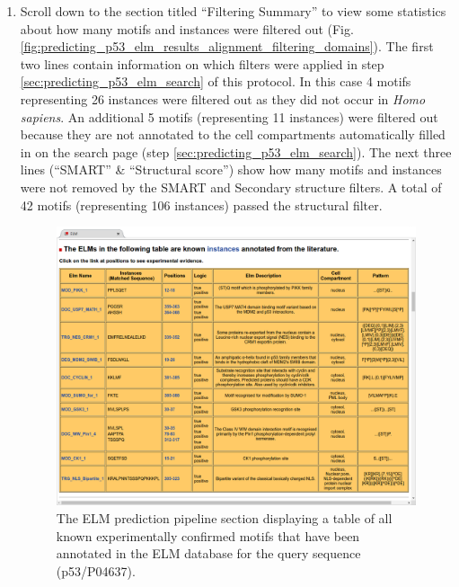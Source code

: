 \documentclass[12pt]{article}
\newcounter{proto}
\begin{document}
\begin{enumerate}
\item Scroll down to the section titled ``Filtering Summary'' to view some
	statistics about how many motifs and instances were filtered out
	(Fig.
	\ref{fig:predicting_p53_elm_results_alignment_filtering_domains}).
	The first two lines contain information on
	which filters were applied in step \ref{sec:predicting_p53_elm_search} of this protocol.
	In this case 4 motifs representing 26 instances were filtered
	out as they did not occur in \textit{Homo sapiens}. An additional 5
	motifs (representing 11 instances) were filtered out because they are
	not annotated to the cell compartments automatically filled in on the
	search page (step \ref{sec:predicting_p53_elm_search}).
	The next three lines (``SMART'' \& ``Structural score'') show how many
	motifs and instances were not removed by the SMART and Secondary
	structure filters. A total of 42 motifs (representing 106 instances)
	passed the structural filter.


\begin{figure}[h!]
	\centering
	\includegraphics[width=\textwidth]{Figures/predicting_p53/elm_results_known.png}
	\caption{
		The ELM prediction pipeline section displaying a table
		of all known experimentally confirmed motifs
		that have been annotated in the ELM database for the query
		sequence (p53/P04637).
	}
	\label{fig:predicting_p53_elm_results_known}
\end{figure}


\end{enumerate}
\end{document}
